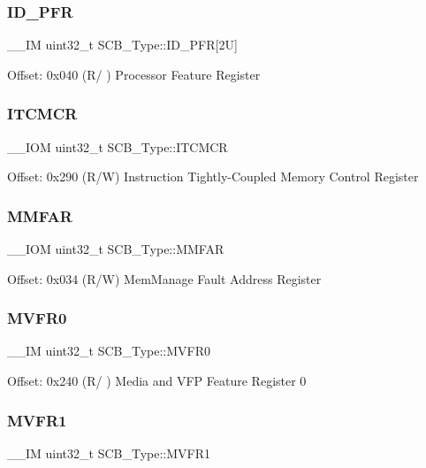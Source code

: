 \subsubsection{\texorpdfstring{ID\_PFR}{ID\_PFR}}
{\footnotesize\ttfamily \+\_\+\+\_\+\+IM uint32\+\_\+t S\+C\+B\+\_\+\+Type\+::\+I\+D\+\_\+\+P\+FR\mbox{[}2\+U\mbox{]}}

Offset\+: 0x040 (R/ ) Processor Feature Register \mbox{\label{structSCB__Type_aba8abbd3db06a07b50f56547501983f9}} 
\subsubsection{\texorpdfstring{ITCMCR}{ITCMCR}}
{\footnotesize\ttfamily \+\_\+\+\_\+\+I\+OM uint32\+\_\+t S\+C\+B\+\_\+\+Type\+::\+I\+T\+C\+M\+CR}

Offset\+: 0x290 (R/W) Instruction Tightly-\/\+Coupled Memory Control Register \mbox{\label{structSCB__Type_a2d03d0b7cec2254f39eb1c46c7445e80}} 
\subsubsection{\texorpdfstring{MMFAR}{MMFAR}}
{\footnotesize\ttfamily \+\_\+\+\_\+\+I\+OM uint32\+\_\+t S\+C\+B\+\_\+\+Type\+::\+M\+M\+F\+AR}

Offset\+: 0x034 (R/W) Mem\+Manage Fault Address Register \mbox{\label{structSCB__Type_a7a1ba0f875c0e97c1673882b1106e66b}} 
\subsubsection{\texorpdfstring{MVFR0}{MVFR0}}
{\footnotesize\ttfamily \+\_\+\+\_\+\+IM uint32\+\_\+t S\+C\+B\+\_\+\+Type\+::\+M\+V\+F\+R0}

Offset\+: 0x240 (R/ ) Media and V\+FP Feature Register 0 \mbox{\label{structSCB__Type_a75d6299150fdcbbcb765e22ff27c432e}} 
\subsubsection{\texorpdfstring{MVFR1}{MVFR1}}
{\footnotesize\ttfamily \+\_\+\+\_\+\+IM uint32\+\_\+t S\+C\+B\+\_\+\+Type\+::\+M\+V\+F\+R1}

